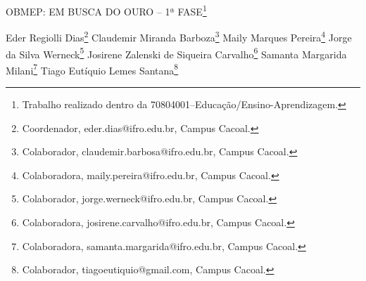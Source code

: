 \documentclass[article,12pt,onesidea,4paper,english,brazil]{abntex2}
\begin{document}
	
	
	\frenchspacing 
	
	\begin{center}
		\LARGE OBMEP: EM BUSCA DO OURO – 1ª FASE\footnote{Trabalho realizado dentro da 70804001–Educação/Ensino-Aprendizagem.}
		
		\normalsize
	Eder Regiolli Dias\footnote{Coordenador, eder.dias@ifro.edu.br, Campus Cacoal.} 
	Claudemir Miranda Barboza\footnote{Colaborador, claudemir.barbosa@ifro.edu.br, Campus Cacoal.} 
	Maily Marques Pereira\footnote{Colaboradora, maily.pereira@ifro.edu.br, Campus Cacoal.} 
	Jorge da Silva Werneck\footnote{Colaborador, jorge.werneck@ifro.edu.br, Campus Cacoal.} 
	Josirene Zalenski de Siqueira Carvalho\footnote{Colaboradora, josirene.carvalho@ifro.edu.br, Campus Cacoal.} 
	Samanta Margarida Milani\footnote{Colaboradora, samanta.margarida@ifro.edu.br, Campus Cacoal.} 
	Tiago Eutíquio Lemes Santana\footnote{Colaborador, tiagoeutiquio@gmail.com, Campus Cacoal.} 
	\end{center}
	
\end{document}
